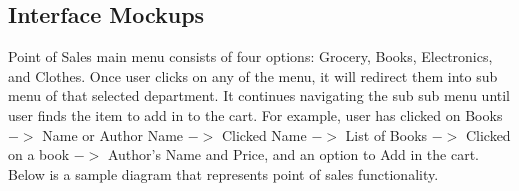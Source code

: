 \documentclass[10pt,conference,onecolumn,compsoc]{IEEEtran}
\begin{document}






\subsection{Interface Mockups}
Point of Sales main menu consists of four options: Grocery, Books, Electronics, and Clothes. Once user clicks on any of the menu, it will redirect them into sub menu of that selected department. It continues navigating the sub sub menu until user finds the item to add in to the cart. For example, user has clicked on Books $->$ Name or Author Name $->$ Clicked Name $->$ List of Books $->$ Clicked on a book $->$ Author's Name and Price, and an option to Add in the cart. \\
Below is a sample diagram that represents point of sales functionality. 

\end{document}
